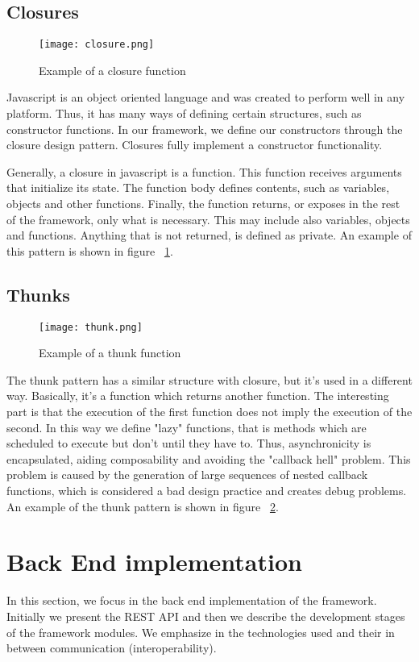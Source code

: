 \subsection{Closures}
\begin{figure}
	\centerline{\texttt{[image: closure.png]}}
	\caption{Example of a closure function}
	\label{closure}
\end{figure} 
Javascript is an object oriented language and was created to perform well in any platform. Thus, it has many ways of defining certain structures, such as constructor functions. In our framework, we define our constructors through the closure design pattern. Closures fully implement a constructor functionality.\par
	Generally, a closure in javascript is a function. This function receives arguments that initialize its state. The function body defines contents, such as variables, objects and other functions. Finally, the function returns, or exposes in the rest of the framework, only what is necessary. This may include also variables, objects and functions. Anything that is not returned, is defined as private. An example of this pattern is shown in figure ~\ref{closure}.

\subsection{Thunks}
\begin{figure}
	\centerline{\texttt{[image: thunk.png]}}
	\caption{Example of a thunk function}
	\label{thunk}
\end{figure} 
The thunk pattern has a similar structure with closure, but it's used in a different way. Basically, it's a function which returns another function. The interesting part is that the execution of the first function does not imply the execution of the second. In this way we define "lazy" functions, that is methods which are scheduled to execute but don't until they have to. Thus, asynchronicity is encapsulated, aiding composability and avoiding the "callback hell" problem. This problem is caused by the generation of large sequences of nested callback functions, which is considered a bad design practice and creates debug problems. An example of the thunk pattern is shown in figure ~\ref{thunk}.

\section{Back End implementation}
In this section, we focus in the back end implementation of the framework. Initially we present the REST API and then we describe the development stages of the framework modules. We emphasize in the technologies used and their in between communication (interoperability).

